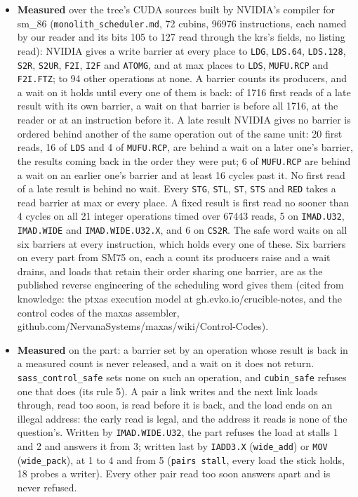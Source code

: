 \begin{itemize}
\item \textbf{Measured} over the tree's CUDA sources built by NVIDIA's compiler for sm\_\allowbreak{}86 (\texttt{monolith\_\allowbreak{}scheduler.\allowbreak{}md}, 72 cubins, 96976 instructions, each named by our reader and its bits 105 to 127 read through the krs's fields, no listing read): NVIDIA gives a write barrier at every place to \texttt{LDG}, \texttt{LDS.\allowbreak{}64}, \texttt{LDS.\allowbreak{}128}, \texttt{S2R}, \texttt{S2UR}, \texttt{F2I}, \texttt{I2F} and \texttt{ATOMG}, and at max places to \texttt{LDS}, \texttt{MUFU.\allowbreak{}RCP} and \texttt{F2I.\allowbreak{}FTZ}; to 94 other operations at none. A barrier counts its producers, and a wait on it holds until every one of them is back: of 1716 first reads of a late result with its own barrier, a wait on that barrier is before all 1716, at the reader or at an instruction before it. A late result NVIDIA gives no barrier is ordered behind another of the same operation out of the same unit: 20 first reads, 16 of \texttt{LDS} and 4 of \texttt{MUFU.\allowbreak{}RCP}, are behind a wait on a later one's barrier, the results coming back in the order they were put; 6 of \texttt{MUFU.\allowbreak{}RCP} are behind a wait on an earlier one's barrier and at least 16 cycles past it. No first read of a late result is behind no wait. Every \texttt{STG}, \texttt{STL}, \texttt{ST}, \texttt{STS} and \texttt{RED} takes a read barrier at max or every place. A fixed result is first read no sooner than 4 cycles on all 21 integer operations timed over 67443 reads, 5 on \texttt{IMAD.\allowbreak{}U32}, \texttt{IMAD.\allowbreak{}WIDE} and \texttt{IMAD.\allowbreak{}WIDE.\allowbreak{}U32.\allowbreak{}X}, and 6 on \texttt{CS2R}. The safe word waits on all six barriers at every instruction, which holds every one of these. Six barriers on every part from SM75 on, each a count its producers raise and a wait drains, and loads that retain their order sharing one barrier, are as the published reverse engineering of the scheduling word gives them (cited from knowledge: the ptxas execution model at gh.evko.io/crucible-notes, and the control codes of the maxas assembler, github.com/NervanaSystems/maxas/wiki/Control-Codes).
\item \textbf{Measured} on the part: a barrier set by an operation whose result is back in a measured count is never released, and a wait on it does not return. \texttt{sass\_\allowbreak{}control\_\allowbreak{}safe} sets none on such an operation, and \texttt{cubin\_\allowbreak{}safe} refuses one that does (its rule 5). A pair a link writes and the next link loads through, read too soon, is read before it is back, and the load ends on an illegal address: the early read is legal, and the address it reads is none of the question's. Written by \texttt{IMAD.\allowbreak{}WIDE.\allowbreak{}U32}, the part refuses the load at stalls 1 and 2 and answers it from 3; written last by \texttt{IADD3.\allowbreak{}X} (\texttt{wide\_\allowbreak{}add}) or \texttt{MOV} (\texttt{wide\_\allowbreak{}pack}), at 1 to 4 and from 5 (\texttt{pairs stall}, every load the stick holds, 18 probes a writer). Every other pair read too soon answers apart and is never refused.
\end{itemize}

